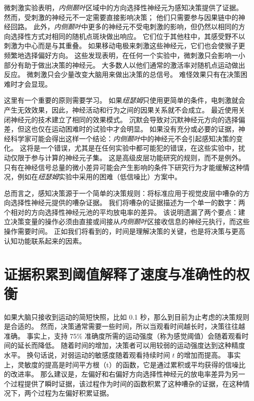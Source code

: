 微刺激实验表明，\textit{内侧颞叶}区域中的方向选择性神经元为感知决策提供了证据。
然而，受刺激的神经元不一定需要直接影响决策；
他们只需要参与因果链中的神经回路。
此外，\textit{内侧颞叶}中更多的神经元不受电刺激的影响，但仍然以相同的方向选择性方式对相同的随机点斑块做出响应。
它们位于其他柱中，其感受野不以刺激为中心而是与其重叠。
如果移动电极来刺激这些神经元，它们也会使猴子更频繁地选择偏好方向。
这些发现表明，在任何一个实验中，微刺激只会影响一小部分有助于做出决策的神经元。
大多数人以他们通常的激活率对随机点运动做出反应。
微刺激只会少量改变大脑用来做出决策的总信号。
难怪效果只有在决策困难时才会显现。


这里有一个重要的原则需要学习。
如果\textit{纽瑟姆}只使用更简单的条件，电刺激就会产生无效效果，因此，神经活动和行为之间的因果关系就不会成立。
最近使用关闭神经元的技术建立了相同的效果模式。
沉默会导致对沉默神经元方向的选择偏差，但这也仅在运动困难时的试验中才会明显。
如果没有充分或必要的证据，神经科学家可能会得出这样一个结论：\textit{内侧颞叶}中的神经元不会引起感知决策的变化。
这将是一个错误，尤其是在任何实验中都可能犯的错误，在这些实验中，扰动仅限于参与计算的神经元子集。
这是高级皮层功能研究的规则，而不是例外。
只有在神经信号总量的微小差异可能会产生影响的条件下研究行为才能缓解这种情况，例如在\textit{纽瑟姆}实验中采用的困难（低信噪比）方案中。


总而言之，感知决策源于一个简单的决策规则：将标准应用于视觉皮层中嘈杂的方向选择性神经元提供的嘈杂证据。
我们将嘈杂的证据描述为一个单一的数字：两个相对的方向选择性神经元池的平均放电率的差异。
该说明遗漏了两个要点：建立决策变量的操作必须由直接或间接从\textit{内侧颞叶}区接收信息的神经元执行，而这些操作需要时间。
正如我们将看到的，时间是理解决策的关键，也是将决策与更高认知功能联系起来的因素。



\section{证据积累到阈值解释了速度与准确性的权衡}

如果大脑只接收到运动的简短快照，比如 0.1 秒，那么到目前为止考虑的决策规则是合适的。
然而，决策通常需要一些时间，所以当观看时间越长时，决策往往越准确。
事实上，支持 75\% 准确度所需的运动强度（称为感觉阈值）会随着观看时间的延长而降低。
随着时间的增加，决策者可以用较弱的运动强度达到这种精度水平。
换句话说，对弱运动的敏感度随着观看持续时间 $ t $ 的增加而提高。
事实上，灵敏度的提高是时间平方根（t）的函数，它是通过累积或平均获得的信噪比的改进率。
那么建议是，左偏好和右偏好方向选择性神经元的放电率差异为另一个过程提供了瞬时证据，该过程作为时间的函数积累了这种嘈杂的证据，在这种情况下，两个过程为左偏好积累证据。


